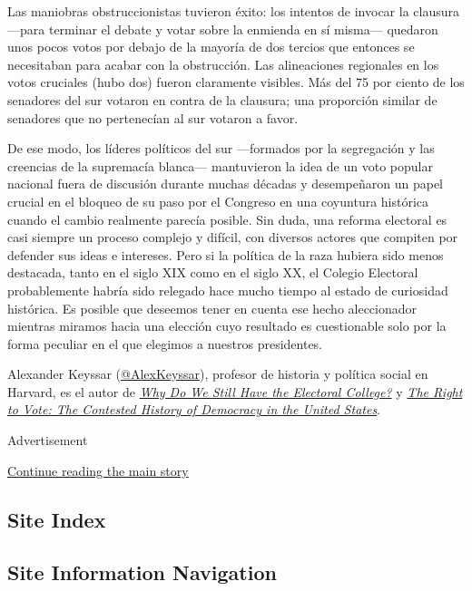 Las maniobras obstruccionistas tuvieron éxito: los intentos de invocar
la clausura ---para terminar el debate y votar sobre la enmienda en sí
misma--- quedaron unos pocos votos por debajo de la mayoría de dos
tercios que entonces se necesitaban para acabar con la obstrucción. Las
alineaciones regionales en los votos cruciales (hubo dos) fueron
claramente visibles. Más del 75 por ciento de los senadores del sur
votaron en contra de la clausura; una proporción similar de senadores
que no pertenecían al sur votaron a favor.

De ese modo, los líderes políticos del sur ---formados por la
segregación y las creencias de la supremacía blanca--- mantuvieron la
idea de un voto popular nacional fuera de discusión durante muchas
décadas y desempeñaron un papel crucial en el bloqueo de su paso por el
Congreso en una coyuntura histórica cuando el cambio realmente parecía
posible. Sin duda, una reforma electoral es casi siempre un proceso
complejo y difícil, con diversos actores que compiten por defender sus
ideas e intereses. Pero si la política de la raza hubiera sido menos
destacada, tanto en el siglo XIX como en el siglo XX, el Colegio
Electoral probablemente habría sido relegado hace mucho tiempo al estado
de curiosidad histórica. Es posible que deseemos tener en cuenta ese
hecho aleccionador mientras miramos hacia una elección cuyo resultado es
cuestionable solo por la forma peculiar en el que elegimos a nuestros
presidentes.

Alexander Keyssar
(\href{https://twitter.com/alexkeyssar?lang=en}{@AlexKeyssar}), profesor
de historia y política social en Harvard, es el autor de
\href{https://www.hup.harvard.edu/catalog.php?isbn=9780674660151\#:~:text=After\%20tracing\%20the\%20Electoral\%20College's,showing\%20why\%20each\%20has\%20failed.}{\emph{Why
Do We Still Have the Electoral College?}} y
\href{https://www.basicbooks.com/titles/alexander-keyssar/the-right-to-vote/9780465005024/}{\emph{The
Right to Vote: The Contested History of Democracy in the United
States}}.

Advertisement

\protect\hyperlink{after-bottom}{Continue reading the main story}

\hypertarget{site-index}{%
\subsection{Site Index}\label{site-index}}

\hypertarget{site-information-navigation}{%
\subsection{Site Information
Navigation}\label{site-information-navigation}}

